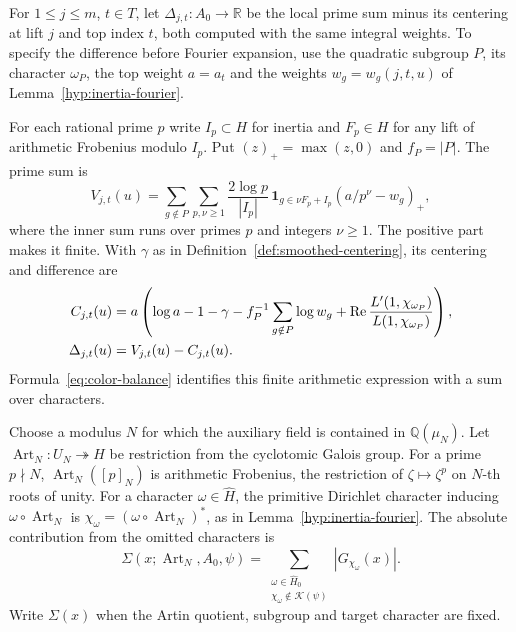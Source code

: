 \begin{definition}\label{def:translate-errors}
For \(1\le j\le m\), \(t\in T\), let \(\Delta_{j,t}:A_0\to\mathbb R\)
be the local prime sum minus its centering at lift \(j\) and top index \(t\),
both computed with the same integral weights. To specify the difference before
Fourier expansion, use the quadratic subgroup \(P\), its character
\(\omega_P\), the top weight \(a=a_t\) and the weights
\(w_g=w_g(j,t,u)\) of Lemma~\ref{hyp:inertia-fourier}.

For each rational prime \(p\) write \(I_p\subset H\) for inertia and
\(F_p\in H\) for any lift of arithmetic Frobenius modulo \(I_p\).
Put \((z)_+=\max(z,0)\) and \(f_P=|P|\). The prime sum is
\[
 V_{j,t}(u)=\sum_{g\notin P}\sum_{p,\nu\ge1}
    \frac{2\log p}{|I_p|}\,\mathbf1_{g\in\nu F_p+I_p}
               (a/p^\nu-w_g)_+ ,
\]
where the inner sum runs over primes \(p\) and integers \(\nu\ge1\).
The positive part makes it finite. With \(\gamma\) as in
Definition~\ref{def:smoothed-centering}, its centering and difference are
\[
 \begin{aligned}
 C_{j,t}(u)&=a\left(\log a-1-\gamma
   -f_P^{-1}\sum_{g\notin P}\log w_g
   +\operatorname{Re}\frac{L'(1,\chi_{\omega_P})}{L(1,\chi_{\omega_P})}\right),\\
 \Delta_{j,t}(u)&=V_{j,t}(u)-C_{j,t}(u).
 \end{aligned}
\]
Formula~\eqref{eq:color-balance} identifies this finite arithmetic
expression with a sum over characters.

Choose a modulus \(N\) for which the auxiliary field is contained in
\(\mathbb Q(\mu_N)\). Let \(\operatorname{Art}_N:U_N\twoheadrightarrow H\)
be restriction from the cyclotomic Galois group. For a prime \(p\nmid N\),
\(\operatorname{Art}_N([p]_N)\) is arithmetic Frobenius, the restriction
of \(\zeta\mapsto\zeta^p\) on \(N\)-th roots of unity.
For a character \(\omega\in\widehat H\), the primitive Dirichlet character
inducing \(\omega\circ\operatorname{Art}_N\) is
\(\chi_\omega=(\omega\circ\operatorname{Art}_N)^*\), as in Lemma~\ref{hyp:inertia-fourier}.
The absolute contribution from the omitted characters is
\[
 \Sigma(x;\operatorname{Art}_N,A_0,\psi)
   =\sum_{\substack{\omega\in\widehat H_0\\
              \chi_\omega\notin\mathcal K(\psi)}} |G_{\chi_\omega}(x)|.
\]
Write \(\Sigma(x)\) when the Artin quotient, subgroup and target character are fixed.
\end{definition}

